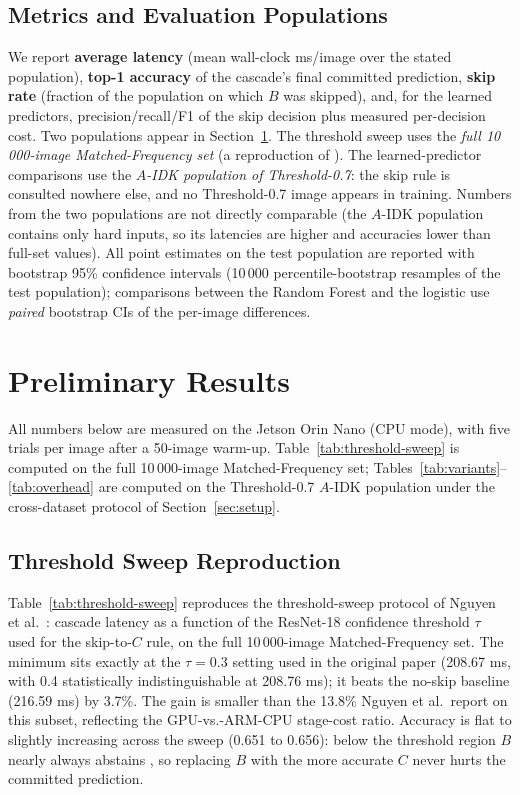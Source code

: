 \documentclass[conference]{IEEEtran}
\begin{document}
\subsection{Metrics and Evaluation Populations}
We report \textbf{average latency} (mean wall-clock ms/image over the stated population), \textbf{top-1 accuracy} of the cascade's final committed prediction, \textbf{skip rate} (fraction of the population on which $B$ was skipped), and, for the learned predictors, precision/recall/F1 of the skip decision plus measured per-decision cost. Two populations appear in Section~\ref{sec:results}. The threshold sweep uses the \emph{full 10\,000-image Matched-Frequency set} (a reproduction of \cite{nguyen2024probabilistic}). The learned-predictor comparisons use the \emph{$A$-IDK population of Threshold-0.7}: the skip rule is consulted nowhere else, and no Threshold-0.7 image appears in training. Numbers from the two populations are not directly comparable (the $A$-IDK population contains only hard inputs, so its latencies are higher and accuracies lower than full-set values). All point estimates on the test population are reported with bootstrap 95\% confidence intervals (10\,000 percentile-bootstrap resamples of the test population); comparisons between the Random Forest and the logistic use \emph{paired} bootstrap CIs of the per-image differences.

\section{Preliminary Results}
\label{sec:results}

All numbers below are measured on the Jetson Orin Nano (CPU mode), with five trials per image after a 50-image warm-up. Table~\ref{tab:threshold-sweep} is computed on the full 10\,000-image Matched-Frequency set; Tables~\ref{tab:variants}--\ref{tab:overhead} are computed on the Threshold-0.7 $A$-IDK population under the cross-dataset protocol of Section~\ref{sec:setup}.

\subsection{Threshold Sweep Reproduction}
Table~\ref{tab:threshold-sweep} reproduces the threshold-sweep protocol of Nguyen et al.\ \cite{nguyen2024probabilistic}: cascade latency as a function of the ResNet-18 confidence threshold $\tau$ used for the skip-to-$C$ rule, on the full 10\,000-image Matched-Frequency set. The minimum sits exactly at the $\tau=0.3$ setting used in the original paper (208.67 ms, with 0.4 statistically indistinguishable at 208.76 ms); it beats the no-skip baseline (216.59 ms) by 3.7\%. The gain is smaller than the 13.8\% Nguyen et al.\ report on this subset, reflecting the GPU-vs.-ARM-CPU stage-cost ratio. Accuracy is flat to slightly increasing across the sweep (0.651 to 0.656): below the threshold region $B$ nearly always abstains \cite{nguyen2024probabilistic}, so replacing $B$ with the more accurate $C$ never hurts the committed prediction.
\end{document}
